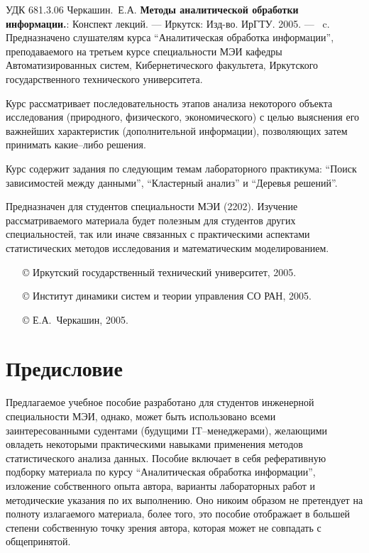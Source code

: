 \documentclass[12pt, openany, twoside]{book} %
\newenvironment{mygroup}{}{}
\begin{document}
\newpage
\begin{mygroup}
\thispagestyle{empty}
\noindent УДК 681.3.06
\vfill\footnotesize
{Черкашин.~Е.А.} {\bf Методы аналитической обработки информации.}: Конспект лекций. ---
Иркутск: Изд-во. ИрГТУ. 2005. --- \pageref{pg:lastpage}~c.
\vfill
Предназначено слушателям курса
``Аналитическая обработка информации'', преподаваемого на третьем курсе
специальности МЭИ кафедры Автоматизированных систем, Кибернетического факультета,
Иркутского государственного технического университета.

Курс рассматривает последовательность этапов
анализа некоторого объекта исследования (природного, физического,
экономического) с целью выяснения его важнейших  характеристик (дополнительной
информации), позволяющих затем
принимать какие--либо решения.

Курс содержит задания по следующим темам лабораторного практикума: ``Поиск зависимостей между данными'',
``Кластерный анализ'' и ``Деревья решений''.

    Предназначен для студентов специальности
МЭИ (2202).
Изучение рассматриваемого материала будет полезным для студентов других специальностей, так или иначе связанных с практическими аспектами статистических методов исследования и математическим моделированием.

\vfill\vfill

\vfill
\hbox{}\hfill
\begin{minipage}{0.6\linewidth}
\begin{itemize}
\setlength{\itemsep}{0pt}
\setlength{\parsep}{0pt}
\item[\copyright{}] Иркутский государственный технический университет, 2005.\item[\copyright{}] Институт динамики систем и теории управления СО РАН, 2005.
\item[\copyright{}] Е.А.~Черкашин, 2005.
\end{itemize}
\end{minipage}
\end{mygroup}
\tableofcontents
\clearpage

\newpage
\section*{Предисловие}
\thispagestyle{empty}

Предлагаемое учебное пособие разработано для студентов
 инженерной специальности МЭИ, однако, может быть использовано всеми
заинтересованными судентами (будущими IT--менеджерами),
желающими овладеть некоторыми практическими навыками применения методов
статистического анализа данных.
Пособие включает в себя рефе\-ра\-тив\-ную
подборку материала по курсу ``Аналитическая обработка информации'',
изложение собственного опыта автора, варианты лабораторных работ и методические
указания по их выполнению. Оно никоим образом не претендует на
полноту излагаемого материала, более того, это пособие отображает в большей
степени собственную точку зрения автора, которая может не совпадать с общепринятой.
\end{document}
